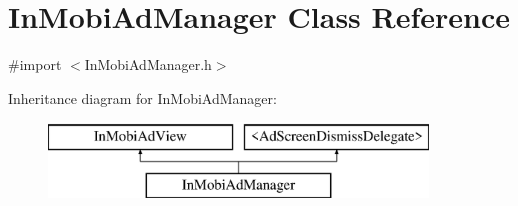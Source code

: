 \hypertarget{interface_in_mobi_ad_manager}{
\section{InMobiAdManager Class Reference}
\label{interface_in_mobi_ad_manager}
}


{\ttfamily \#import $<$InMobiAdManager.h$>$}

Inheritance diagram for InMobiAdManager:\begin{figure}[H]
\begin{center}
\leavevmode
\includegraphics[height=2.000000cm]{interface_in_mobi_ad_manager}
\end{center}
\end{figure}
